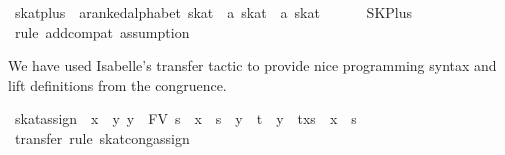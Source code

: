 \documentclass{llncs}
\begin{document}
\begin{isabellebody}
\isanewline
{}\isamarkupfalse%
\ skat{}plus\ {}{}\ {}{}a{}{}ranked{}alphabet\ skat\ {}\ {}a\ skat\ {}\ {}a\ skat{}
\isanewline\ \ {}\ {}{}{}\ {}{}{}\ \ SKPlus\isanewline
%
\isadelimproof
\ \ %
\endisadelimproof
%
\isatagproof
{}\isamarkupfalse%
\ {}rule\ add{}compat{}\ assumption{}{}%
\endisatagproof\isanewline
\end{isabellebody}

\noindent We have used Isabelle's transfer tactic to provide nice
programming syntax and lift definitions from the congruence.

\begin{isabellebody}
\isanewline
{}\isamarkupfalse%
\ skat{}assign{}{}\isanewline \ \ {}{}x\ {}\ y{}\ y\ {}\ FV\ s{}\ {}\ {}x\ {}{}\ s\ {}\ y\ {}{}\ t{}\ {}\ {}y\ {}{}\ t{}x{}s{}\ {}\ x\ {}{}\ s{}{}\isanewline
%
\isadelimproof
\ \ %
\endisadelimproof
%
\isatagproof
{}\isamarkupfalse%
\ {}transfer{}\ rule\ skat{}cong{}assign{}{}%
\endisatagproof\isanewline
\end{isabellebody}
\end{document}
